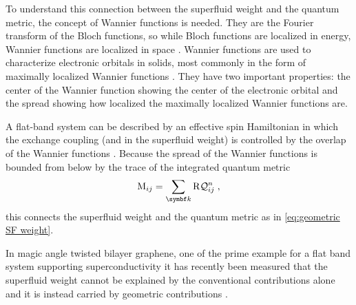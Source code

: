 \documentclass[../main.tex]{subfiles}
\begin{document}
To understand this connection between the superfluid weight and the quantum metric, the concept of Wannier functions is needed.
They are the Fourier transform of the Bloch functions, so while Bloch functions are localized in energy, Wannier functions are localized in space \cite{marzariMaximallyLocalizedWannier2012}.
Wannier functions are used to characterize electronic orbitals in solids, most commonly in the form of maximally localized Wannier functions \cite{marzariMaximallyLocalizedGeneralized1997}.
They have two important properties: the center of the Wannier function showing the center of the electronic orbital and the spread showing how localized the maximally localized Wannier functions are.

A flat-band system can be described by an effective spin Hamiltonian in which the exchange coupling (and in the superfluid weight) is controlled by the overlap of the Wannier functions \cite{tovmasyanEffectiveTheoryEmergent2016}.
Because the spread of the Wannier functions is bounded from below by the trace of the integrated quantum metric
\begin{equation}
	\mathrm{M}_{ij} = \sum_{\vb{k}} \Re \mathcal{Q}_{ij}^n \;,
\end{equation}
this connects the superfluid weight and the quantum metric as in \cref{eq:geometric SF weight}.

In magic angle twisted bilayer graphene, one of the prime example for a flat band system supporting superconductivity it has recently been measured that the superfluid weight cannot be explained by the conventional contributions alone and it is instead carried by geometric contributions \cite{tanakaSuperfluidStiffnessMagicangle2025}.
\end{document}

